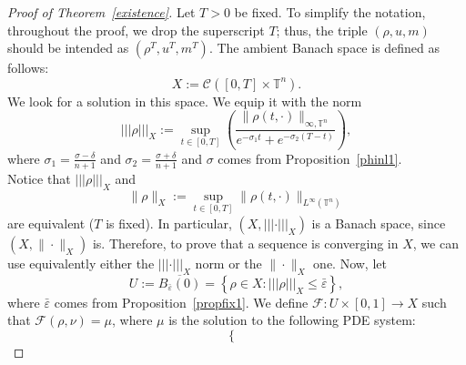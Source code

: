 \documentclass[10pt,a4paper,nouppercase,nowrite]{article}
\numberwithin{equation}{section}
\newcommand{\eps}{\varepsilon}
\newcommand{\T}{\mathbb{T}}
\newcommand{\triplenorm}[1]{%
	\left\lvert\!\left\lvert\!\left\lvert #1
	\right\rvert\!\right\rvert\!\right\rvert}
\theoremstyle{definition}
\begin{document}
		\begin{proof}[Proof of Theorem~\ref{existence}]
			Let $T > 0$ be fixed. To simplify the notation, throughout the proof, we drop the superscript $T$; thus, the triple $(\rho,u,m)$ should be intended as $(\rho^T,u^T,m^T)$. The ambient Banach space is defined as follows:
			$$X:=\mathcal{C}([0,T] \times \T^n).$$
			We look for a solution in this space. We equip it with the norm
			\begin{equation}
				\triplenorm{\rho}_X := \sup_{t \in [0,T]} \left( \frac{\|\rho(t,\cdot)\|_{{\infty},\T^n}}{e^{-\sigma_1 t} + e^{-\sigma_2(T-t)}} \right),
				\label{norm3}
			\end{equation}
			where $\sigma_1=\frac{\sigma-\delta}{n+1}$ and $\sigma_2=\frac{\sigma+\delta}{n+1}$ and $\sigma$ comes from Proposition~\ref{phinl1}. \\
			Notice that $\triplenorm{\rho}_X$ and
			\begin{equation}
				\|\rho\|_X:=\sup_{t \in [0,T]} \|\rho(t,\cdot)\|_{L^{\infty}(\T^n)}
				\label{norm2}
			\end{equation} 
			are equivalent ($T$ is fixed). In particular, $(X,\triplenorm{\cdot}_X)$ is a Banach space, since $(X,\| \cdot \|_X)$ is.
			Therefore, to prove that a sequence is converging in $X$, we can use equivalently either the $\triplenorm{\cdot}_X$ norm or the $\| \cdot \|_X$ one.
			Now, let
			$$U:=\overline{B_{\bar{\eps}}(0)} = \left\{ \rho \in X : \triplenorm{\rho}_X\le  \bar{\eps} \right\},$$
			where $\bar{\eps}$ comes from Proposition~\ref{propfix1}. %
			We define $\mathcal{F} :  U \times [0,1] \to X$ such that $\mathcal{F}(\rho,\nu)=\mu$, where $\mu$ is the solution to the following PDE system:
			\begin{equation}
				\begin{cases}

\end{cases}
\end{equation}
\end{proof}
\end{document}
